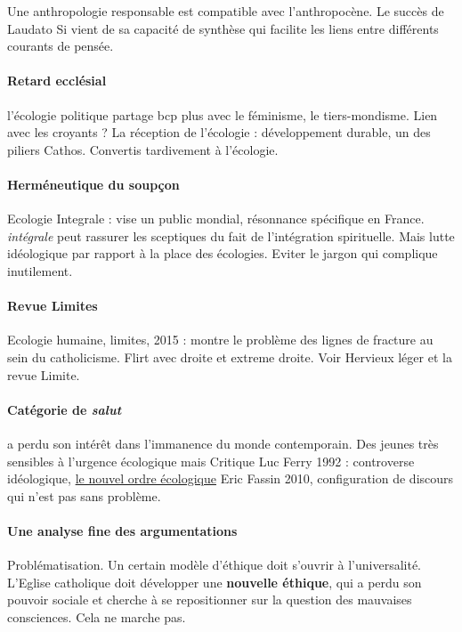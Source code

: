 Une anthropologie responsable est compatible avec l'anthropocène. Le succès de Laudato Si vient de sa capacité de synthèse qui facilite les liens entre différents courants de pensée.

\paragraph{Retard ecclésial} l'écologie politique partage bcp plus avec le féminisme, le tiers-mondisme. Lien avec les croyants ? La réception de l'écologie : développement durable, un des piliers
Cathos. Convertis tardivement à l'écologie. 

\paragraph{Herméneutique du soupçon} Ecologie Integrale : vise un public mondial, résonnance spécifique en France. \textit{intégrale} peut rassurer les sceptiques du fait de l'intégration spirituelle. Mais lutte idéologique par rapport à la place des écologies. Eviter le jargon qui complique inutilement.

\paragraph{Revue Limites}

Ecologie humaine, limites, 2015 : montre le problème des lignes de fracture au sein du catholicisme. Flirt avec droite et extreme droite. 
Voir Hervieux léger et la revue Limite.

\paragraph{Catégorie de \textit{salut}} a perdu son intérêt dans l'immanence du monde contemporain. Des jeunes très sensibles à l'urgence écologique mais 
Critique
Luc Ferry 1992 : controverse idéologique, \href{https://fr.wikipedia.org/wiki/Le_Nouvel_Ordre_%C3%A9cologique}{le nouvel ordre écologique}
Eric Fassin 2010, configuration de discours qui n'est pas sans problème.

\paragraph{Une analyse fine des argumentations} Problématisation. Un certain modèle d'éthique doit s'ouvrir à l'universalité. L'Eglise catholique doit développer une \textbf{nouvelle éthique}, qui a perdu son pouvoir sociale et cherche à se repositionner sur la question des mauvaises consciences. Cela ne marche pas. 

